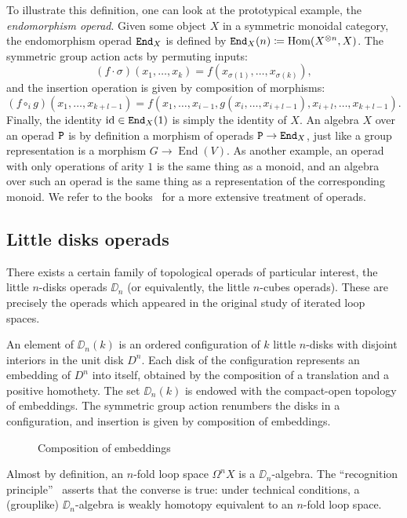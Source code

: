 To illustrate this definition, one can look at the prototypical example, the \emph{endomorphism operad}.
Given some object $X$ in a symmetric monoidal category, the endomorphism operad $\mathtt{End}_{X}$ is defined by $\mathtt{End}_{X}(n) \coloneqq \operatorname{Hom}(X^{\otimes n}, X)$.
The symmetric group action acts by permuting inputs:
\[ (f \cdot \sigma)(x_{1}, \dots, x_{k}) = f(x_{\sigma(1)}, \dots, x_{\sigma(k)}), \]
and the insertion operation is given by composition of morphisms:
\[ (f \circ_{i} g)(x_{1}, \dots, x_{k+l-1}) = f(x_{1}, \dots, x_{i-1}, g(x_{i}, \dots, x_{i+l-1}), x_{i+l}, \dots, x_{k+l-1}). \]
Finally, the identity $\operatorname{id} \in \mathtt{End}_{X}(1)$ is simply the identity of $X$.
An algebra $X$ over an operad $\mathtt{P}$ is by definition a morphism of operads $\mathtt{P} \to \mathtt{End}_{X}$, just like a group representation is a morphism $G \to \operatorname{End}(V)$.
As another example, an operad with only operations of arity $1$ is the same thing as a monoid, and an algebra over such an operad is the same thing as a representation of the corresponding monoid.
We refer to the books~\cite{LodayVallette2012,Fresse2017} for a more extensive treatment of operads.

\subsection{Little disks operads}
\label{intro.sec.little-disks-operads}

There exists a certain family of topological operads of particular interest, the little $n$-disks operads $\DD_{n}$ (or equivalently, the little $n$-cubes operads).
These are precisely the operads which appeared in the original study of iterated loop spaces.



An element of $\DD_{n}(k)$ is an ordered configuration of $k$ little $n$-disks with disjoint interiors in the unit disk $D^{n}$.
Each disk of the configuration represents an embedding of $D^{n}$ into itself, obtained by the composition of a translation and a positive homothety.
The set $\DD_{n}(k)$ is endowed with the compact-open topology of embeddings.
The symmetric group action renumbers the disks in a configuration, and insertion is given by composition of embeddings.

\begin{figure}[htbp]
  \centering
  
  \caption{Composition of embeddings}
  \label{intro.fig.compos-embed}
\end{figure}

Almost by definition, an $n$-fold loop space $\Omega^{n} X$ is a $\DD_{n}$-algebra.
The ``recognition principle''~\cite{May1972,BoardmanVogt1973} asserts that the converse is true: under technical conditions, a (grouplike) $\DD_{n}$-algebra is weakly homotopy equivalent to an $n$-fold loop space.

